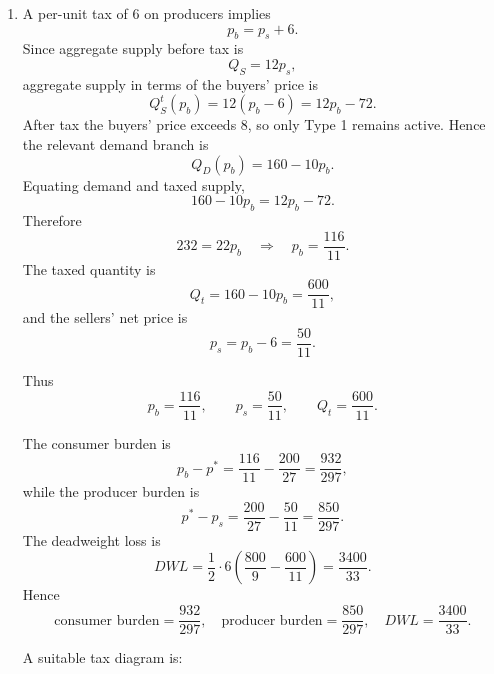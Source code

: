 \documentclass[12pt]{article}
\begin{document}
\begin{enumerate}[label=(\alph*)]
    Producer surplus is
    \[
    PS=\frac12 p^*Q^*
    =\frac12\cdot \frac{200}{27}\cdot \frac{800}{9}
    =\frac{80000}{243}.
    \]
    Hence
    \[
    \boxed{PS=\frac{80000}{243}.}
    \]

    \item
    A per-unit tax of \(6\) on producers implies
    \[
    p_b=p_s+6.
    \]
    Since aggregate supply before tax is
    \[
    Q_S=12p_s,
    \]
    aggregate supply in terms of the buyers' price is
    \[
    Q_S^t(p_b)=12(p_b-6)=12p_b-72.
    \]
    After tax the buyers' price exceeds 8, so only Type 1 remains active. Hence the relevant demand branch is
    \[
    Q_D(p_b)=160-10p_b.
    \]
    Equating demand and taxed supply,
    \[
    160-10p_b=12p_b-72.
    \]
    Therefore
    \[
    232=22p_b
    \quad\Longrightarrow\quad
    p_b=\frac{116}{11}.
    \]
    The taxed quantity is
    \[
    Q_t=160-10p_b=\frac{600}{11},
    \]
    and the sellers' net price is
    \[
    p_s=p_b-6=\frac{50}{11}.
    \]

    Thus
    \[
    \boxed{p_b=\frac{116}{11},\qquad p_s=\frac{50}{11},\qquad Q_t=\frac{600}{11}.}
    \]

    The consumer burden is
    \[
    p_b-p^*=\frac{116}{11}-\frac{200}{27}=\frac{932}{297},
    \]
    while the producer burden is
    \[
    p^*-p_s=\frac{200}{27}-\frac{50}{11}=\frac{850}{297}.
    \]
    The deadweight loss is
    \[
    DWL=\frac12\cdot 6\left(\frac{800}{9}-\frac{600}{11}\right)
    =\frac{3400}{33}.
    \]
    Hence
    \[
    \boxed{\text{consumer burden}=\frac{932}{297},\quad \text{producer burden}=\frac{850}{297},\quad DWL=\frac{3400}{33}.}
    \]

    A suitable tax diagram is:

    \begin{center}
\end{center}
\end{enumerate}
\end{document}

